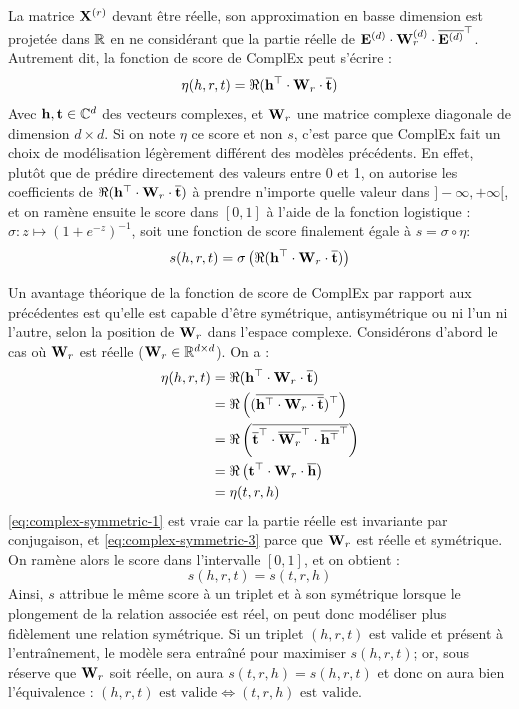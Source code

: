 La matrice $\bf{X}^{(r)}$ devant être réelle, son approximation en basse dimension est projetée dans $\R$ en ne considérant que la partie réelle de $\bf{E}^{(d)} \cdot \bf{W}_r^{(d)} \cdot \compconj{ \bf{E}^{(d)}}^\top$. Autrement dit, la fonction de score de ComplEx peut s'écrire :
\begin{equation}
    \eta(h, r, t) = \Re(\bf{h^\top \cdot W}_r \cdot \compconj{\bf{t}})
\end{equation}
Avec $\bf{h, t} \in \mathbb{C}^d$ des vecteurs complexes, et $\bf{W}_r$ une matrice complexe diagonale de dimension $d \times d$. Si on note $\eta$ ce score et non $s$, c'est parce que ComplEx fait un choix de modélisation légèrement différent des modèles précédents. En effet, plutôt que de prédire directement des valeurs entre 0 et 1, on autorise les coefficients de $\Re(\bf{h^\top \cdot W}_r \cdot \compconj{\bf{t}})$ à prendre n'importe quelle valeur dans $] -\infty, +\infty[$, et on ramène ensuite le score dans $[0, 1]$ à l'aide de la fonction logistique : $\sigma : z \mapsto (1 + e^{-z})^{-1}$, soit une fonction de score finalement égale à $s = \sigma \circ \eta$:
\begin{equation}
    s(h, r, t) = \sigma \left( \Re(\bf{h^\top \cdot W}_r \cdot \compconj{\bf{t}}) \right)
\end{equation}

Un avantage théorique de la fonction de score de ComplEx par rapport aux précédentes est qu'elle est capable d'être symétrique, antisymétrique ou ni l'un ni l'autre, selon la position de $\bf{W}_r$ dans l'espace complexe. Considérons d'abord le cas où $\bf{W}_r$ est réelle ($\bf{W}_r \in \R^{d \times d}$). On a :
\begin{align}
    \eta(h, r, t) &= \Re(\bf{h^\top \cdot W}_r \cdot \compconj{\bf{t}}) \\
    &= \Re\left((\compconj{\bf{h^\top \cdot W}_r \cdot \compconj{\bf{t}}})^\top\right) \label{eq:complex-symmetric-1} \\
    &= \Re\left( \compconj{\compconj{\bf{t}}^\top \cdot \compconj{\bf{W}_r}^\top \cdot 
    \compconj{\bf{h^\top}}^\top}\right) \label{eq:complex-symmetric-2} \\
    &= \Re\left(\bf{t}^\top \cdot \bf{W}_r \cdot \compconj{\bf{h}}\right) \label{eq:complex-symmetric-3} \\
    &= \eta(t, r, h)
\end{align}
\ref{eq:complex-symmetric-1} est vraie car la partie réelle est invariante par conjugaison, et \ref{eq:complex-symmetric-3} parce que $\bf{W}_r$ est réelle et symétrique. On ramène alors le score dans l'intervalle $[0, 1]$, et on obtient :
\begin{equation}
    s(h, r, t) = s(t, r, h)
\end{equation}
Ainsi, $s$ attribue le même score à un triplet et à son symétrique lorsque le plongement de la relation associée est réel, on peut donc modéliser plus fidèlement une relation symétrique. 
Si un triplet $(h, r, t)$ est valide et présent à l'entraînement, le modèle sera entraîné pour maximiser $s(h, r, t)$; or, sous réserve que $\bf{W}_r$ soit réelle, on aura $s(t, r, h) = s(h, r, t)$ et donc on aura bien l'équivalence : $(h, r, t) \text{ est valide} \iff (t, r, h) \text{ est valide}$.

